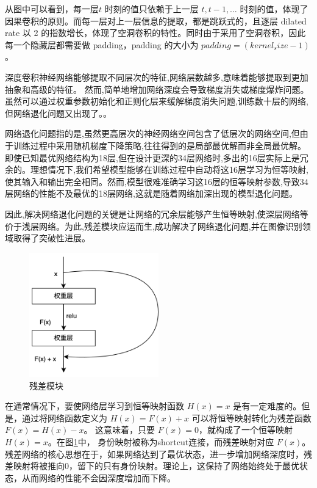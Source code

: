 从图中可以看到，每一层$t$ 时刻的值只依赖于上一层 $t, t - 1, \dots$ 时刻的值，体现了因果卷积的原则。而每一层对上一层信息的提取，都是跳跃式的，且逐层 dilated rate 以 2 的指数增长，体现了空洞卷积的特性。同时由于采用了空洞卷积，因此每一个隐藏层都需要做 padding，padding 的大小为 $padding = (kernel_size - 1)$。

深度卷积神经网络能够提取不同层次的特征,网络层数越多,意味着能够提取到更加抽象和高级的特征。
然而,简单地增加网络深度会导致梯度消失或梯度爆炸问题。虽然可以通过权重参数初始化和正则化层来缓解梯度消失问题,训练数十层的网络,但网络退化问题又出现了。\cite{吕国豪2014基于卷积神经网络的正则化方法}。

网络退化问题指的是,虽然更高层次的神经网络空间包含了低层次的网络空间,但由于训练过程中采用随机梯度下降策略,往往得到的是局部最优解而非全局最优解。
即使已知最优网络结构为18层,但在设计更深的34层网络时,多出的16层实际上是冗余的。理想情况下,我们希望模型能够在训练过程中自动将这16层学习为恒等映射,使其输入和输出完全相同。然而,模型很难准确学习这16层的恒等映射参数,导致34层网络的性能不及最优的18层网络,这就是随着网络加深出现的模型退化问题。

因此,解决网络退化问题的关键是让网络的冗余层能够产生恒等映射,使深层网络等价于浅层网络。为此,残差模块应运而生,成功解决了网络退化问题,并在图像识别领域取得了突破性进展。

\begin{figure}[htbp]
	\centering
	\includegraphics[width=0.5\textwidth]{figures/residual_block.png}
	\caption{残差模块}
	\label{residual_block}
\end{figure}

在通常情况下，要使网络层学习到恒等映射函数 $H(x) = x$ 是有一定难度的。但是，通过将网络函数定义为 $H(x) = F(x) + x$ 可以将恒等映射转化为残差函数 $F(x) = H(x) - x$。 这意味着，只要  $F(x) = 0$，就构成了一个恒等映射 $H(x) = x$。在图\ref{residual_block}中，
身份映射被称为shortcut连接，而残差映射对应 $F(x)$。残差网络的核心思想在于，如果网络达到了最优状态，进一步增加网络深度时，残差映射将被推向0，留下的只有身份映射。理论上，这保持了网络始终处于最优状态，从而网络的性能不会因深度增加而下降。

